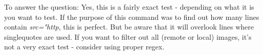 To answer the question: Yes, this is a fairly exact test - depending on what it is you want to test. If the purpose of this command was to find out how many lines contain \textit{src="http}, this is perfect. But be aware that it will overlook lines where singlequotes are used. If you want to filter out all (remote or local) images, it's not a very exact test - consider using proper regex.
